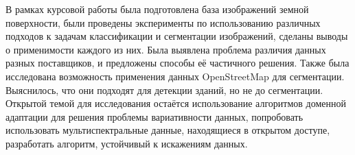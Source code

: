 В рамках курсовой работы была подготовлена база изображений земной поверхности,
были проведены эксперименты по использованию различных подходов к задачам
классификации и сегментации изображений, сделаны выводы о применимости каждого
из них. Была выявлена проблема различия данных разных поставщиков, и предложены
способы её частичного решения. Также была исследована возможность применения
данных OpenStreetMap для сегментации. Выяснилось, что они подходят для детекции
зданий, но не до сегментации. Открытой темой для исследования остаётся
использование алгоритмов доменной адаптации для решения проблемы вариативности
данных, попробовать использовать мультиспектральные данные, находящиеся в
открытом доступе, разработать алгоритм, устойчивый к искажениям данных.
